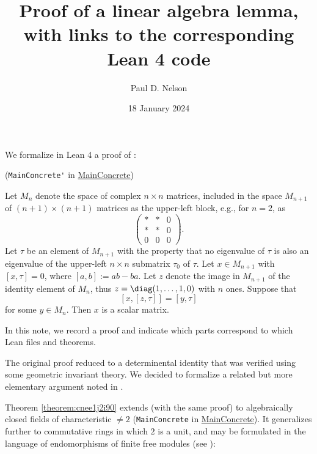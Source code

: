 \documentclass[reqno]{amsart} 
\title{Proof of a linear algebra lemma, with links to the corresponding Lean 4 code}
\author{Paul D. Nelson}
\date{18 January 2024}
\begin{document}
\maketitle

We formalize in Lean 4 a proof of \cite[Theorem 1.8]{2020arXiv201202187N}:

\begin{theorem}\label{theorem:cnee1j2i90}
  (\verb|MainConcrete'| in \href{MainConcrete.lean}{MainConcrete})

  Let $M_{n}$ denote the space of complex $n \times n$ matrices, included in the space $M_{n+1}$ of $(n+1) \times (n+1)$ matrices as the upper-left block, e.g., for $n = 2$, as
  \[
    \begin{pmatrix}
      \ast & \ast & 0 \\
      \ast & \ast & 0 \\
      0 & 0 & 0
    \end{pmatrix}.
  \]
  Let $\tau$ be an element of $M_{n+1}$ with the property that no eigenvalue of $\tau$ is also an eigenvalue of the upper-left $n \times n$ submatrix $\tau_0$ of $\tau$.  Let $x \in M_{n+1}$ with $[x,\tau] = 0$, where $[a,b] := a b -b a$.  Let $z$ denote the image in $M_{n+1}$ of the identity element of $M_n$, thus $z = \diag(1,\dotsc,1,0)$ with $n$ ones.  Suppose that
  \[
    [x,[z,\tau]] = [y, \tau]
  \]
  for some $y \in M_n$.  Then $x$ is a scalar matrix.
\end{theorem}

In this note, we record a proof and indicate which parts correspond to which Lean files and theorems.

\begin{remark}
  The original proof reduced to a determinental identity \cite[Theorem 17.2]{2020arXiv201202187N} that was verified using some geometric invariant theory.  We decided to formalize a related but more elementary argument noted in \cite[Remark 5.15]{2023arXiv2309.06314}.
\end{remark}

Theorem \ref{theorem:cnee1j2i90} extends (with the same proof) to algebraically closed fields of characteristic $\neq 2$ (\verb|MainConcrete| in \href{MainConcrete.lean}{MainConcrete}).  It generalizes further to commutative rings in which $2$ is a unit, and may be formulated in the language of endomorphisms of finite free modules (see \cite[Remark 5.15]{2023arXiv2309.06314}):
\end{document}
